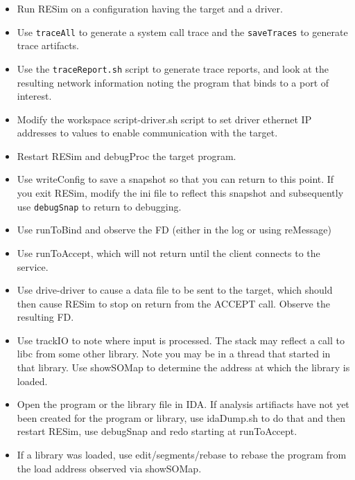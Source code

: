 \documentclass[titlepage]{article}
\begin{document}
\begin{itemize}
\item Run RESim on a configuration having the target and a driver.

\item Use {\tt traceAll} to generate a system call trace and the {\tt saveTraces} to generate
trace artifacts.

\item Use the {\tt traceReport.sh} script to generate trace reports,
and look at the resulting network information noting the
program that binds to a port of interest.

\item Modify the workspace script-driver.sh script to set
driver ethernet IP addresses to values to enable communication
with the target.

\item Restart RESim and debugProc the target program. 

\item Use writeConfig to save a snapshot so that you can return to this point.
If you exit RESim, modify the ini file to reflect this snapshot and subsequently
use {\tt debugSnap} to return to debugging.

\item Use runToBind and observe the FD (either in the log
or using reMessage)

\item Use runToAccept, which will not return until the client
connects to the service.  

\item Use drive-driver to cause a data file to be sent to the target, which 
should then cause RESim to stop on return from the ACCEPT call.  Observe the resulting FD.

\item Use trackIO to note where input is processed.  The stack
may reflect a call to libc from some other library.  Note
you may be in a thread that started in that library.  Use
showSOMap to determine the address at which
the library is loaded.

\item Open the program or the library file in IDA.  If analysis artifiacts have not yet
been created for the program or library, use idaDump.sh to do that and then restart RESim,
use debugSnap and redo starting at runToAccept. 

\item If a library was loaded, use edit/segments/rebase to rebase the program from the load address
observed via showSOMap.


\end{itemize}
\end{document}
